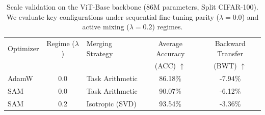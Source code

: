 \begin{table}[ht]
  \caption{Scale validation on the ViT-Base backbone (86M parameters, Split CIFAR-100). We evaluate key configurations under sequential fine-tuning parity ($\lambda=0.0$) and active mixing ($\lambda=0.2$) regimes.}
  \label{tab:vit_base_results}
  \vskip 0.1in
  \begin{center}
  \begin{small}
  \begin{sc}
  \setlength{\tabcolsep}{8pt}
  \begin{tabular}{lclcc}
    \toprule
    Optimizer & Regime ($\lambda$) & Merging Strategy & Average Accuracy & Backward Transfer \\
    & & & (ACC) $\uparrow$ & (BWT) $\uparrow$ \\
    \midrule
    AdamW & 0.0 & Task Arithmetic & 86.18\% & -7.94\% \\
    SAM & 0.0 & Task Arithmetic & 90.07\% & -6.12\% \\
    \midrule
    SAM & 0.2 & Isotropic (SVD) & 93.54\% & -3.36\% \\
    \bottomrule
  \end{tabular}
  \end{sc}
  \end{small}
  \end{center}
  \vskip -0.1in
\end{table}

